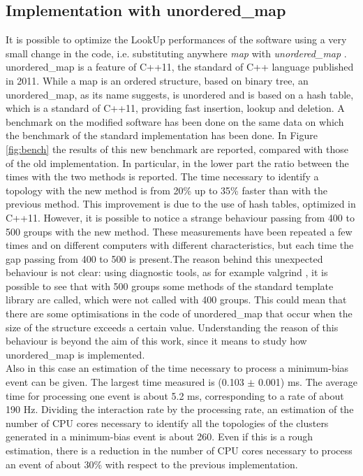 \subsection{Implementation with unordered\_map}
It is possible to optimize the LookUp performances of the software using a very small change in the code, i.e. substituting anywhere \textit{map} with \textit{unordered\_map} \cite{unord}. unordered\_map is a feature of C++11, the standard of C++ language published in 2011. While a map is an ordered structure, based on binary tree, an unordered\_map, as its name suggests, is unordered and is based on a hash table, which is a standard of C++11, providing fast insertion, lookup and deletion. A benchmark on the modified software has been done on the same data on which the benchmark of the standard implementation has been done.
In Figure \ref{fig:bench} the results of this new benchmark are reported, compared with those of the old implementation. In particular, in the lower part the ratio between the times with the two methods is reported. The time necessary to identify a topology with the new method is from 20\% up to 35\% faster than with the previous method. This improvement is due to the use of hash tables, optimized in C++11. However, it is possible to notice a strange behaviour passing from 400 to 500 groups with the new method. These measurements have been repeated a few times and on different computers with different characteristics, but each time the gap passing from 400 to 500 is present.The reason behind this unexpected behaviour is not clear: using diagnostic tools, as for example valgrind \cite{valgrind}, it is possible to see that with 500 groups some methods of the standard template library are called, which were not called with 400 groups. This could mean that there are some optimisations in the code of unordered\_map that occur when the size of the structure exceeds a certain value. Understanding the reason of this behaviour is beyond the aim of this work, since it means to study how unordered\_map is implemented.\\
Also in this case an estimation of the time necessary to process a minimum-bias event can be given. The largest time measured is (0.103 $\pm$ 0.001) ms. The average time for processing one event is about 5.2 ms, corresponding to a rate of about 190 Hz. Dividing the interaction rate by the processing rate, an estimation of the number of CPU cores necessary to identify all the topologies of the clusters generated in a minimum-bias event is about 260. Even if this is a rough estimation, there is a reduction in the number of CPU cores necessary to process an event of about 30\% with respect to the previous implementation.
